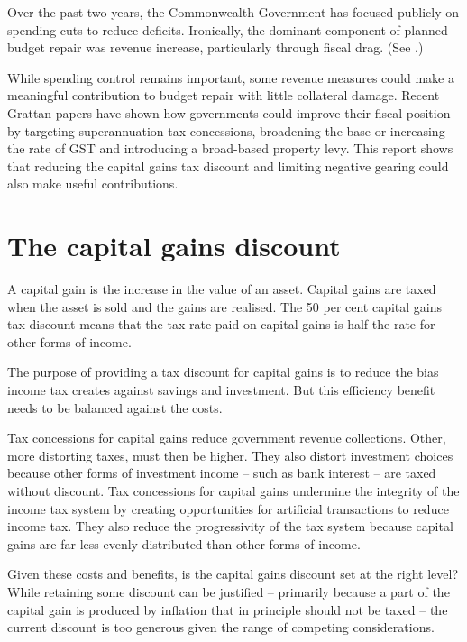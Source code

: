Over the past two years, the Commonwealth Government has focused publicly on spending cuts to reduce deficits. Ironically, the dominant component of planned budget repair was revenue increase, particularly through fiscal drag. (See .) %
 
While spending control remains important, some revenue measures could make a meaningful contribution to budget repair with little collateral damage. Recent Grattan papers have shown how governments could improve their fiscal position by targeting superannuation tax concessions, broadening the base or increasing the rate of GST and introducing a broad-based property levy. This report shows that reducing the capital gains tax discount and limiting negative gearing could also make useful contributions.


\chapter{The capital gains discount}\label{chapter:The-capital-gains-discount}
A capital gain is the increase in the value of an asset. Capital gains are taxed when the asset is sold and the gains are realised. The 50 per cent capital gains tax discount means that the tax rate paid on capital gains is half the rate for other forms of income. 

The purpose of providing a tax discount for capital gains is to reduce the bias income tax creates against savings and investment. But this efficiency benefit needs to be balanced against the costs. 

Tax concessions for capital gains reduce government revenue collections. Other, more distorting taxes, must then be higher. They also distort investment choices because other forms of investment income – such as bank interest – are taxed without discount. Tax concessions for capital gains undermine the integrity of the income tax system by creating opportunities for artificial transactions to reduce income tax. They also reduce the progressivity of the tax system because capital gains are far less evenly distributed than other forms of income. 

Given these costs and benefits, is the capital gains discount set at the right level? While retaining some discount can be justified – primarily because a part of the capital gain is produced by inflation that in principle should not be taxed – the current discount is too generous given the range of competing considerations.



